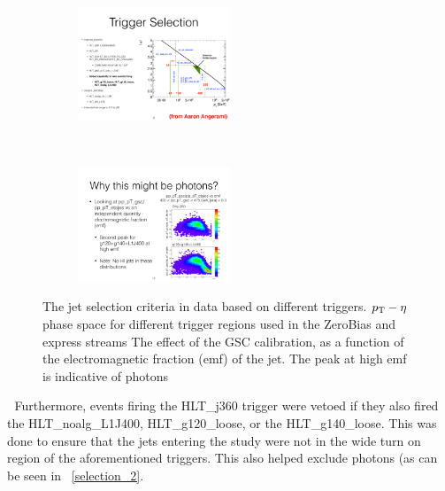 


\begin{figure}
\centering
\begin{subfigure}[b]{\textwidth}
    \centering
    \includegraphics[width=0.5\textwidth]{figures/qualification/TrigMap.pdf}
    \caption{}
    \label{fig:trigmap_a}
\end{subfigure} \\
\begin{subfigure}[b]{\textwidth}
    \centering
    \includegraphics[width=0.5\textwidth]{figures/qualification/PhotonEx.pdf}
    \caption{}
    \label{fig:trigmap_b}
\end{subfigure}\hfill
   \caption{The jet selection criteria in data based on different triggers. \protect{} $\mbox{$p_{\mathrm{T}}$}-\eta$ phase space for different trigger regions used in the ZeroBias and express streams \protect{}The effect of the GSC calibration, as a function of the electromagnetic fraction (emf) of the jet. The peak at high emf is indicative of photons }
\label{fig:TrigMap}
\end{figure}

Furthermore, events firing the HLT\_j360 trigger were vetoed if they also fired the HLT\_noalg\_L1J400, HLT\_g120\_loose, or the HLT\_g140\_loose. This was done to ensure that the jets entering the study were not in the wide turn on region of the aforementioned triggers. This also helped exclude photons (as can be seen in ~\ref{selection_2}.



